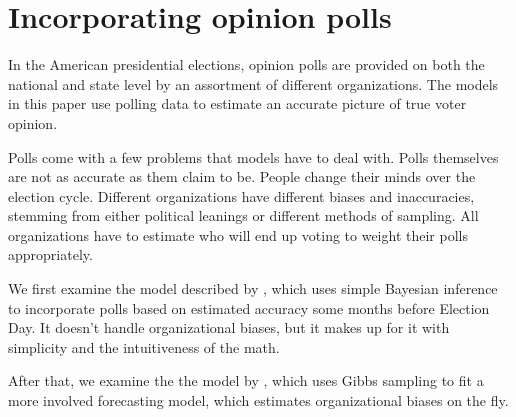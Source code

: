 \documentclass[thesis.tex]{subfiles}
\begin{document}
\section{Incorporating opinion polls}

In the American presidential elections, opinion polls are provided on both the national and state level by an assortment of different organizations. The models in this paper use polling data to estimate an accurate picture of true voter opinion.

Polls come with a few problems that models have to deal with. Polls themselves are not as accurate as them claim to be. People change their minds over the election cycle. Different organizations have different biases and inaccuracies, stemming from either political leanings or different methods of sampling. All organizations have to estimate who will end up voting to weight their polls appropriately.

We first examine the model described by \cite{Lock:2010aa}, which uses simple Bayesian inference to incorporate polls based on estimated accuracy some months before Election Day. It doesn't handle organizational biases, but it makes up for it with simplicity and the intuitiveness of the math.

After that, we examine the the model by \cite{Strauss:2007aa}, which uses Gibbs sampling to fit a more involved forecasting model, which estimates organizational biases on the fly.
\end{document}
